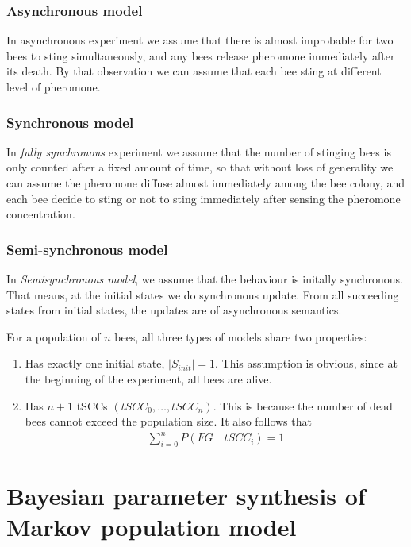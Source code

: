 \documentclass[12pt]{article}
\theoremstyle{definition}
\begin{document}
\subsubsection*{Asynchronous model}
In asynchronous experiment we assume that there is almost improbable for two
bees to sting simultaneously, and any bees release pheromone immediately after
its death. By that observation we can assume that each bee
sting at different level of pheromone.\\


\subsubsection*{Synchronous model}
In \textit{fully synchronous} experiment we assume that the number of stinging
bees is only counted after a fixed amount of time, so that without loss of
generality we can assume the pheromone diffuse almost immediately among the bee
colony, and each bee decide to sting or not to sting immediately after sensing
the pheromone concentration.\\



\subsubsection*{Semi-synchronous model}
In \textit{Semisynchronous model}, we assume that the behaviour is initally
synchronous. That means, at the initial states we do synchronous update. From
all succeeding states from initial states, the updates are of asynchronous semantics.


For a population of $n$ bees, all three types of models share two properties:
\begin{enumerate}
\item Has exactly one initial state, $|S_{init}| = 1$. This assumption is
  obvious, since at the beginning of the experiment, all bees are alive.
\item Has $n+1$ tSCCs $(tSCC_0,\ldots,tSCC_n)$. This is because the number of
  dead bees cannot exceed the population size. It also follows that
  \begin{align*}
    \sum_{i=0}^n P(FG\quad tSCC_i) = 1
  \end{align*}
\end{enumerate}


\section{Bayesian parameter synthesis of Markov population model}
\end{document}
